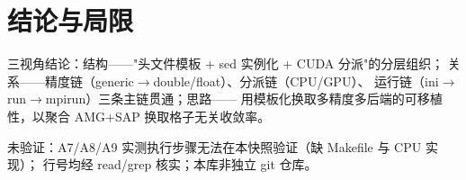 \documentclass[UTF8]{ctexart}
\begin{document}
\section{结论与局限}
\begin{conclbox}
三视角结论：\textcolor{struct}{结构}——"头文件模板 + sed 实例化 + CUDA 分派"的分层组织；
\textcolor{relation}{关系}——精度链（generic$\rightarrow$double/float）、分派链（CPU/GPU）、
运行链（ini$\rightarrow$run$\rightarrow$mpirun）三条主链贯通；\textcolor{idea}{思路}——
用模板化换取多精度多后端的可移植性，以聚合 AMG+SAP 换取格子无关收敛率。
\end{conclbox}
\begin{warnbox}
\textcolor{warn}{未验证}：A7/A8/A9 实测执行步骤无法在本快照验证（缺 Makefile 与 CPU 实现）；
行号均经 read/grep 核实；本库非独立 git 仓库。
\end{warnbox}
\end{document}
